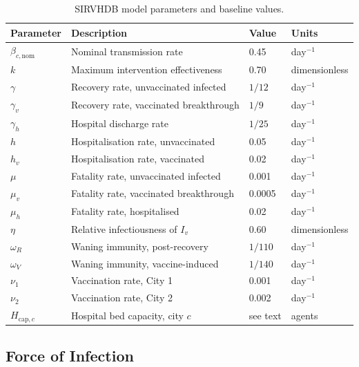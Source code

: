 \begin{table}[ht]
\centering
\caption{SIRVHDB model parameters and baseline values.}
\label{tab:parameters}
\begin{tabular}{@{}llll@{}}
\toprule
\textbf{Parameter} & \textbf{Description} & \textbf{Value} & \textbf{Units} \\
\midrule
$\beta_{c,\mathrm{nom}}$ & Nominal transmission rate             & 0.45     & day$^{-1}$ \\
$k$             & Maximum intervention effectiveness       & 0.70     & dimensionless \\
$\gamma$        & Recovery rate, unvaccinated infected     & $1/12$   & day$^{-1}$ \\
$\gamma_v$      & Recovery rate, vaccinated breakthrough   & $1/9$    & day$^{-1}$ \\
$\gamma_h$      & Hospital discharge rate                  & $1/25$   & day$^{-1}$ \\
$h$             & Hospitalisation rate, unvaccinated       & 0.05     & day$^{-1}$ \\
$h_v$           & Hospitalisation rate, vaccinated         & 0.02     & day$^{-1}$ \\
$\mu$           & Fatality rate, unvaccinated infected     & 0.001    & day$^{-1}$ \\
$\mu_v$         & Fatality rate, vaccinated breakthrough   & 0.0005   & day$^{-1}$ \\
$\mu_h$         & Fatality rate, hospitalised              & 0.02     & day$^{-1}$ \\
$\eta$          & Relative infectiousness of $I_v$         & 0.60     & dimensionless \\
$\omega_R$      & Waning immunity, post-recovery           & $1/110$  & day$^{-1}$ \\
$\omega_V$      & Waning immunity, vaccine-induced         & $1/140$  & day$^{-1}$ \\
$\nu_1$         & Vaccination rate, City 1                 & 0.001    & day$^{-1}$ \\
$\nu_2$         & Vaccination rate, City 2                 & 0.002    & day$^{-1}$ \\
$H_{\mathrm{cap},c}$ & Hospital bed capacity, city $c$     & see text & agents \\
\bottomrule
\end{tabular}
\end{table}

\subsection{Force of Infection}
\label{sec:foi}

